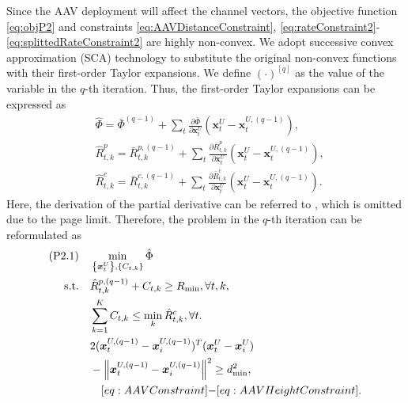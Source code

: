 \documentclass[twocolumn,journal]{IEEEtran}
\begin{document}
Since the AAV deployment will affect the channel vectors, the objective function \eqref{eq:objP2} and constraints \eqref{eq:AAVDistanceConstraint}, \eqref{eq:rateConstraint2}-\eqref{eq:splittedRateConstraint2} are highly non-convex. We adopt successive convex approximation (SCA) technology to substitute the original non-convex functions with their first-order Taylor expansions. 
We define \((\cdot)^{[q]}\) as the value of the variable in the \(q\)-th iteration. Thus, the first-order Taylor expansions can be expressed as
\begin{subequations}
\begin{align}
    &\hat{\Phi} = \bar{{\Phi}}^{(q-1)} + \sum_{t}\frac{\partial \bar{{\Phi}}}{\partial \boldsymbol{x}^{U}_{t}}\left(\boldsymbol{x}^{U}_{t}-\boldsymbol{x}^{U,(q-1)}_{t}\right),\\
    &\hat{R}^{p}_{t,k} = \bar{R}^{p,(q-1)}_{t,k}+\sum_t \frac{\partial \bar{R}^{p}_{t,k}}{\partial \boldsymbol{x}^{U}_{t}}\left(\boldsymbol{x}^{U}_{t}-\boldsymbol{x}^{U,(q-1)}_{t}\right),\\
    &\hat{R}^{c}_{t,k} =\bar{R}^{c,(q-1)}_{t,k}+\sum_t \frac{\partial \bar{R}^{c}_{t,k}}{\partial \boldsymbol{x}^{U}_{t}}\left(\boldsymbol{x}^{U}_{t}-\boldsymbol{x}^{U,(q-1)}_{t}\right).
\end{align}
\end{subequations}
Here, the derivation of the partial derivative can be referred to \cite{lyuJoint2023}, which is omitted due to the page limit. Therefore, the problem in the \(q\)-th iteration can be reformulated as
\begin{subequations}
\begin{align}
 (\text{P2.1})\quad&\min_{\left\{\boldsymbol{x}^{U}_{t}\right\},\left\{C_{t,k}\right\}} \hat{\Phi}\label{eq:objP2}\\
 \text{s.t.}\quad& \hat{R}^{p,(q-1)}_{t,k} + C_{t,k} \geq R_{\min}, \forall t,k, \label{eq:rateConstraint2.1}
    \\
    & \sum_{k=1}^{K} C_{t,k} \leq \min_{k}\hat{R}^{c}_{t,k}, \forall t. \label{eq:splittedRateConstraint2.1}\\
    & 2(\boldsymbol{x}^{U,(q-1)}_{t} - \boldsymbol{x}^{U,(q-1)}_{i})^T(\boldsymbol{x}^{U}_{t} - \boldsymbol{x}^{U}_{i})\notag\\
    & - \left\Vert \boldsymbol{x}^{U,(q-1)}_{t} - \boldsymbol{x}^{U,(q-1)}_{i}\right\Vert^2 \geq d_{\min}^2,\label{eq:relaxUAVdistance}
    \\
    &\quad\eqref{eq:AAVConstraint}\mbox{-}\eqref{eq:AAVHeightConstraint}.\notag
\end{align}
\end{subequations}
\end{document}
